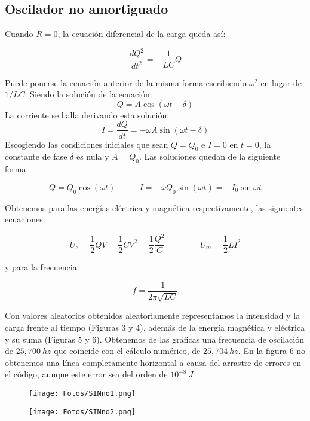 \documentclass{article}
\begin{document}
    \subsection{Oscilador no amortiguado}
    Cuando $R=0$, la ecuación diferencial de la carga queda así:

    \[\frac{dQ^2}{dt^2}=-\frac{1}{LC}Q\]
    
    Puede ponerse la ecuación anterior de la misma forma escribiendo $\omega^2$ en lugar de $1/LC$. Siendo la solución de la ecuación:
    \[Q=A \cos(\omega t - \delta)\]
    La corriente se halla derivando esta solución:
    \[I=\frac{dQ}{dt}=-\omega A \sin(\omega t - \delta)\]
    Escogiendo las condiciones iniciales que sean $Q=Q_0$ e $I=0$ en $t=0$, la constante de fase $\delta$ es nula y $A=Q_0$. Las soluciones quedan de la siguiente forma:
    
    \[Q=Q_0 \cos(\omega t)\ \ \ \ \ \ \ \ \ \ \ \ \ I=-\omega Q_0 \sin(\omega t)=-I_0 \sin{\omega t}\]
    
    Obtenemos para las energías eléctrica y magnética respectivamente, las siguientes ecuaciones:
    
    \[U_e=\frac{1}{2}QV=\frac{1}{2}CV^2=\frac{1}{2}\frac{Q^2}{C}\ \ \ \ \ \ \ \ \ \ \ \ \ \ \ \ \ \ \ U_m=\frac{1}{2}LI^2\]
    
    y para la frecuencia:
    
    \[f=\frac{1}{2\pi\sqrt{LC}}\]
    
    Con valores aleatorios obtenidos aleatoriamente representamos la intensidad y la carga frente al tiempo (Figuras 3 y 4), además de la energía magnética y eléctrica y su suma (Figuras 5 y 6). Obtenemos de las gráficas una frecuencia de oscilación de $25,700\ hz$ que coincide con el cálculo numérico, de $25,704\ hz$. En la figura 6 no obtenemos una línea completamente horizontal a causa del arrastre de errores en el código, aunque este error sea del orden de $10^{-8}\ J$
    
    \begin{figure}[h]
        \centering
        \begin{minipage}{.5\textwidth}
            \centering
            \texttt{[image: Fotos/SINno1.png]}
        \end{minipage}%
        \begin{minipage}{.5\textwidth}
            \centering
            \texttt{[image: Fotos/SINno2.png]}
        \end{minipage}
    \end{figure}
\end{document}

